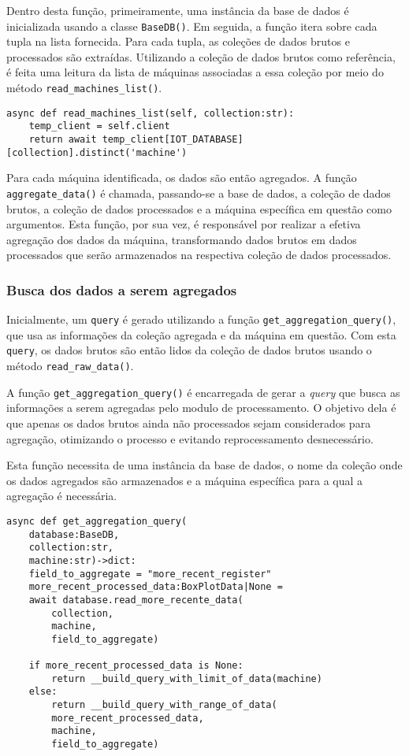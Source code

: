 Dentro desta função, primeiramente, uma instância da base de dados é inicializada usando a classe \texttt{BaseDB()}. Em seguida, a função itera sobre cada tupla na lista fornecida. Para cada tupla, as coleções de dados brutos e processados são extraídas. Utilizando a coleção de dados brutos como referência, é feita uma leitura da lista de máquinas associadas a essa coleção por meio do método \texttt{read\_machines\_list()}.

\begin{verbatim}
async def read_machines_list(self, collection:str):
    temp_client = self.client
    return await temp_client[IOT_DATABASE][collection].distinct('machine')
\end{verbatim}


Para cada máquina identificada, os dados são então agregados. A função \texttt{aggregate\_data()} é chamada, passando-se a base de dados, a coleção de dados brutos, a coleção de dados processados e a máquina específica em questão como argumentos. Esta função, por sua vez, é responsável por realizar a efetiva agregação dos dados da máquina, transformando dados brutos em dados processados que serão armazenados na respectiva coleção de dados processados.

\subsubsection{Busca dos dados a serem agregados}
Inicialmente, um \texttt{query} é gerado utilizando a função \texttt{get\_aggregation\_query()}, que usa as informações da coleção agregada e da máquina em questão. Com esta \texttt{query}, os dados brutos são então lidos da coleção de dados brutos usando o método \texttt{read\_raw\_data()}.

A função \texttt{get\_aggregation\_query()} é encarregada de gerar a \textit{query} que busca as informações a serem agregadas pelo modulo de processamento. O objetivo dela é que apenas os dados brutos ainda não processados sejam considerados para agregação, otimizando o processo e evitando reprocessamento desnecessário.

Esta função necessita de uma instância da base de dados, o nome da coleção onde os dados agregados são armazenados e a máquina específica para a qual a agregação é necessária.

\begin{verbatim}
async def get_aggregation_query(
    database:BaseDB,
    collection:str,
    machine:str)->dict:
    field_to_aggregate = "more_recent_register"
    more_recent_processed_data:BoxPlotData|None = 
    await database.read_more_recente_data(
        collection,
        machine,
        field_to_aggregate)
    
    if more_recent_processed_data is None:
        return __build_query_with_limit_of_data(machine) 
    else:
        return __build_query_with_range_of_data(
        more_recent_processed_data,
        machine,
        field_to_aggregate)
\end{verbatim}

